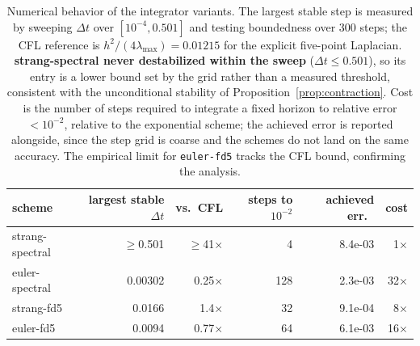 \begin{table}[htbp]
\centering
\small
\caption{Numerical behavior of the integrator variants. The largest stable step is measured by sweeping $\Delta t$ over $[10^{-4}, 0.501]$ and testing boundedness over 300 steps; the CFL reference is $h^2/(4\lambda_{\max}) = 0.01215$ for the explicit five-point Laplacian. \textbf{strang-spectral never destabilized within the sweep} ($\Delta t \le 0.501$), so its entry is a lower bound set by the grid rather than a measured threshold, consistent with the unconditional stability of Proposition~\ref{prop:contraction}. Cost is the number of steps required to integrate a fixed horizon to relative error $<10^{-2}$, relative to the exponential scheme; the achieved error is reported alongside, since the step grid is coarse and the schemes do not land on the same accuracy. The empirical limit for \texttt{euler-fd5} tracks the CFL bound, confirming the analysis.}
\label{tab:numerics}
\begin{tabular}{lrrrrr}
\toprule
scheme & largest stable $\Delta t$ & vs.\ CFL & steps to $10^{-2}$ & achieved err.\ & cost\\
\midrule
strang-spectral & $\ge$0.501 & $\ge$41$\times$ & 4 & 8.4e-03 & 1$\times$ \\
euler-spectral & 0.00302 & 0.25$\times$ & 128 & 2.3e-03 & 32$\times$ \\
strang-fd5 & 0.0166 & 1.4$\times$ & 32 & 9.1e-04 & 8$\times$ \\
euler-fd5 & 0.0094 & 0.77$\times$ & 64 & 6.1e-03 & 16$\times$ \\
\bottomrule
\end{tabular}
\end{table}
